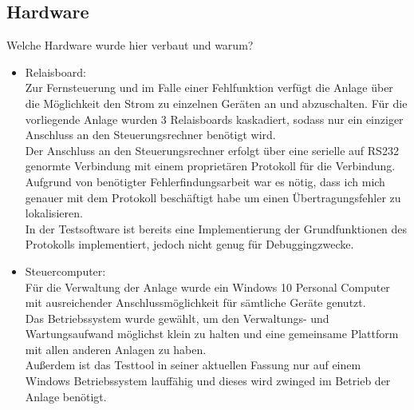 \subsection{Hardware}
Welche Hardware wurde hier verbaut und warum?
\begin{itemize}
        \item Relaisboard: \\
                Zur Fernsteuerung und im Falle einer Fehlfunktion verfügt die Anlage über die Möglichkeit den Strom zu einzelnen Geräten an und abzuschalten. Für die vorliegende Anlage wurden 3 Relaisboards kaskadiert, sodass nur ein einziger Anschluss an den Steuerungsrechner benötigt wird. \\
                Der Anschluss an den Steuerungsrechner erfolgt über eine serielle auf RS232 genormte Verbindung mit einem proprietären Protokoll für die Verbindung. Aufgrund von benötigter Fehlerfindungsarbeit war es nötig, dass ich mich genauer mit dem Protokoll beschäftigt habe um einen Übertragungsfehler zu lokalisieren. \\
                In der Testsoftware ist bereits eine Implementierung der Grundfunktionen des Protokolls implementiert, jedoch nicht genug für Debuggingzwecke.
        \item Steuercomputer: \\
                Für die Verwaltung der Anlage wurde ein Windows 10 Personal Computer mit ausreichender Anschlussmöglichkeit für sämtliche Geräte genutzt. \\
                Das Betriebssystem wurde gewählt, um den Verwaltungs- und Wartungsaufwand möglichst klein zu halten und eine gemeinsame Plattform mit allen anderen Anlagen zu haben. \\
                Außerdem ist das Testtool in seiner aktuellen Fassung nur auf einem Windows Betriebssystem lauffähig und dieses wird zwinged im Betrieb der Anlage benötigt.


\end{itemize}
